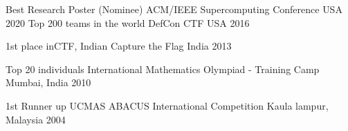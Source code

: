 

\begin{cvhonors}
  \cvhonor
    {Best Research Poster (Nominee)}
    {ACM/IEEE Supercomputing Conference}
    {USA}
    {2020}
  \cvhonor
    {Top 200 teams in the world}
    {DefCon CTF}
    {USA}
    {2016}
    
  \cvhonor
    {1st place}
    {inCTF, Indian Capture the Flag}
    {India}
    {2013}
  
  \cvhonor
    {Top 20 individuals}
    {International Mathematics Olympiad - Training Camp}
    {Mumbai, India}
    {2010}
    
  \cvhonor
    {1st Runner up} %
    {UCMAS ABACUS International Competition} %
    {Kaula lampur, Malaysia} %
    {2004} %
\end{cvhonors}


